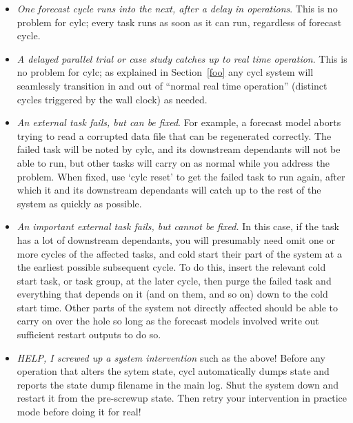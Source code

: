 \documentclass[11pt,a4paper]{article}
\begin{document}
\begin{itemize}
    \item {\em One forecast cycle runs into the next, after a delay in
        operations}. This is no problem for cylc; every task runs as
        soon as it can run, regardless of forecast cycle.

    \item {\em A delayed parallel trial or case study catches up to real
        time operation}. This is no problem for cylc; as explained in
        Section~\ref{foo} any cycl system will seamlessly transition in
        and out of ``normal real time operation'' (distinct cycles
        triggered by the wall clock) as needed.

    \item {\em An external task fails, but can be fixed}. For example, a
        forecast model aborts trying to read a corrupted data file that
        can be regenerated correctly. The failed task will be noted by
        cylc, and its downstream dependants will not be able to run,
        but other tasks will carry on as normal while you address the
        problem. When fixed, use `cylc reset' to get the failed task to
        run again, after which it and its downstream dependants will
        catch up to the rest of the system as quickly as possible.

    \item {\em An important external task fails, but cannot be fixed.}
        In this case, if the task has a lot of downstream dependants,
        you will presumably need omit one or more cycles of the affected
        tasks, and cold start their part of the system at a the earliest
        possible subsequent cycle.  To do this, insert the relevant cold
        start task, or task group, at the later cycle, then purge the
        failed task and everything that depends on it (and on them, and
        so on) down to the cold start time.  Other parts of the system 
        not directly affected should be able to carry on over the hole
        so long as the forecast models involved write out sufficient 
        restart outputs to do so.

    \item {\em HELP, I screwed up a system intervention} such as the
        above!  Before any operation that alters the sytem state, cycl
        automatically dumps state and reports the state dump filename in
        the main log.  Shut the system down and restart it from the
        pre-screwup state. Then retry your intervention in practice mode
        before doing it for real!

\end{itemize}
\end{document}
